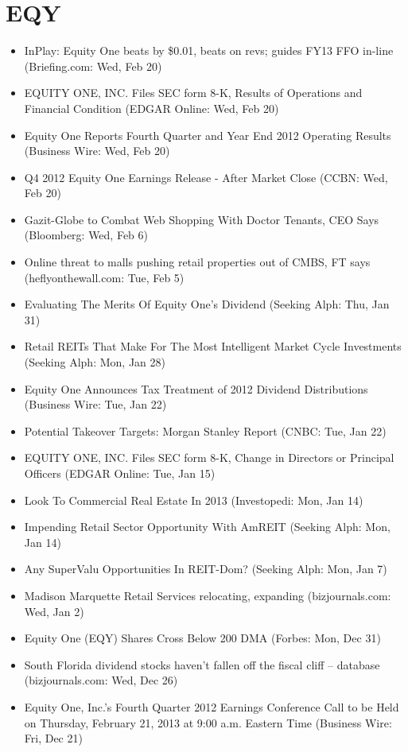 \documentclass[11pt,asymmetric]{article}
\begin{document}
\section*{EQY}
\begin{itemize}
\item InPlay: Equity One beats by \$0.01, beats on revs; guides FY13 FFO in-line (Briefing.com: Wed, Feb 20)
\item EQUITY ONE, INC. Files SEC form 8-K, Results of Operations and Financial Condition (EDGAR Online: Wed, Feb 20)
\item Equity One Reports Fourth Quarter and Year End 2012 Operating Results (Business Wire: Wed, Feb 20)
\item Q4 2012 Equity One Earnings Release - After Market Close (CCBN: Wed, Feb 20)
\item Gazit-Globe to Combat Web Shopping With Doctor Tenants, CEO Says (Bloomberg: Wed, Feb 6)
\item Online threat to malls pushing retail properties out of CMBS, FT says (heflyonthewall.com: Tue, Feb 5)
\item Evaluating The Merits Of Equity One's Dividend (Seeking Alph: Thu, Jan 31)
\item Retail REITs That Make For The Most Intelligent Market Cycle Investments (Seeking Alph: Mon, Jan 28)
\item Equity One Announces Tax Treatment of 2012 Dividend Distributions (Business Wire: Tue, Jan 22)
\item Potential Takeover Targets: Morgan Stanley Report (CNBC: Tue, Jan 22)
\item EQUITY ONE, INC. Files SEC form 8-K, Change in Directors or Principal Officers (EDGAR Online: Tue, Jan 15)
\item Look To Commercial Real Estate In 2013 (Investopedi: Mon, Jan 14)
\item Impending Retail Sector Opportunity With AmREIT (Seeking Alph: Mon, Jan 14)
\item Any SuperValu Opportunities In REIT-Dom? (Seeking Alph: Mon, Jan 7)
\item Madison Marquette Retail Services relocating, expanding (bizjournals.com: Wed, Jan 2)
\item Equity One (EQY) Shares Cross Below 200 DMA (Forbes: Mon, Dec 31)
\item South Florida dividend stocks haven't fallen off the fiscal cliff – database (bizjournals.com: Wed, Dec 26)
\item Equity One, Inc.’s Fourth Quarter 2012 Earnings Conference Call to be Held on Thursday, February 21, 2013 at 9:00 a.m. Eastern Time (Business Wire: Fri, Dec 21)

\end{itemize}
\end{document}
